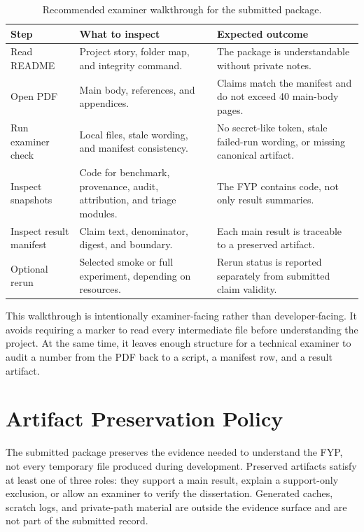 \begin{table}[htbp]
\centering
\caption{Recommended examiner walkthrough for the submitted package.}
\label{tab:examiner-walkthrough}
\tighttable
\begin{tabularx}{\textwidth}{@{}L{2.00cm}YY@{}}
\toprule
Step & What to inspect & Expected outcome \\
\midrule
Read README & Project story, folder map, and integrity command. & The package is understandable without private notes. \\
Open PDF & Main body, references, and appendices. & Claims match the manifest and do not exceed 40 main-body pages. \\
Run examiner check & Local files, stale wording, and manifest consistency. & No secret-like token, stale failed-run wording, or missing canonical artifact. \\
Inspect snapshots & Code for benchmark, provenance, audit, attribution, and triage modules. & The FYP contains code, not only result summaries. \\
Inspect result manifest & Claim text, denominator, digest, and boundary. & Each main result is traceable to a preserved artifact. \\
Optional rerun & Selected smoke or full experiment, depending on resources. & Rerun status is reported separately from submitted claim validity. \\
\bottomrule
\end{tabularx}
\end{table}

This walkthrough is intentionally examiner-facing rather than developer-facing. It avoids requiring a marker to read every intermediate file before understanding the project. At the same time, it leaves enough structure for a technical examiner to audit a number from the PDF back to a script, a manifest row, and a result artifact.

\section{Artifact Preservation Policy}

The submitted package preserves the evidence needed to understand the FYP, not every temporary file produced during development. Preserved artifacts satisfy at least one of three roles: they support a main result, explain a support-only exclusion, or allow an examiner to verify the dissertation. Generated caches, scratch logs, and private-path material are outside the evidence surface and are not part of the submitted record.

